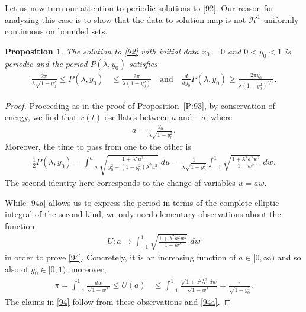 \documentclass{amsart}
\newcommand{\qtq}[1]{\quad\text{#1}\quad}
\newtheorem{proposition}[theorem]{Proposition}
\theoremstyle{definition}
\numberwithin{equation}{section}
\renewcommand{\H}{\mathcal H}
\begin{document}
Let us now turn our attention to periodic solutions to \eqref{92}. Our reason for analyzing this case is to show that the data-to-solution map is not $\H^1$-uniformly continuous on bounded sets.

\begin{proposition}\label{P:94}
The solution to \eqref{92} with initial data $x_0=0$ and $0<y_0<1$ is periodic and the period $P(\lambda,y_0)$ satisfies
\begin{align}\label{94}
\tfrac{2\pi}{\lambda\sqrt{1-y_0^2}} \leq P(\lambda,y_0) &\leq \tfrac{2\pi}{\lambda(1-y_0^2)}
	\qtq{and} \tfrac{d}{dy_0} P(\lambda,y_0) \geq \tfrac{2\pi y_0}{\lambda(1-y_0^2)^{3/2}}.
\end{align}
\end{proposition}

\begin{proof}
Proceeding as in the proof of Proposition~\ref{P:93}, by conservation of energy, we find that $x(t)$ oscillates between $a$ and $-a$, where
\begin{align*}
a = \tfrac{y_0}{\lambda \sqrt{1-y_0^2}}.
\end{align*}
Moreover, the time to pass from one to the other is
\begin{align}\label{94a}
\tfrac12 P(\lambda,y_0) = \int_{-a}^a \sqrt{ \tfrac{1+\lambda^2u^2}{y_0^2-(1-y_0^2)\lambda^2u^2} }\;du
	= \tfrac{1}{\lambda\sqrt{1-y_0^2}} \int_{-1}^1 \sqrt{ \tfrac{1+\lambda^2a^2w^2}{1-w^2} }\;dw.
\end{align}
The second identity here corresponds to the change of variables $u=aw$.

While \eqref{94a} allows us to express the period in terms of the complete elliptic integral of the second kind, we only need elementary observations
about the function
\begin{align}\label{94b}
U:a\mapsto \int_{-1}^1 \sqrt{ \tfrac{1+\lambda^2a^2w^2}{1-w^2} }\;dw
\end{align}
in order to prove \eqref{94}.  Concretely, it is an increasing function of $a\in[0,\infty)$ and so also of $y_0\in[0,1)$; moreover,
\begin{align*}
\pi = \int_{-1}^1 \tfrac{dw}{\sqrt{1-w^2}}\leq U(a) &\leq \int_{-1}^1 \tfrac{\sqrt{1+a^2\lambda^2}\;dw}{\sqrt{1-w^2}} = \tfrac{\pi}{\sqrt{1-y_0^2}}. 
\end{align*}
The claims in \eqref{94} follow from these observations and \eqref{94a}.
\end{proof}
\end{document}
